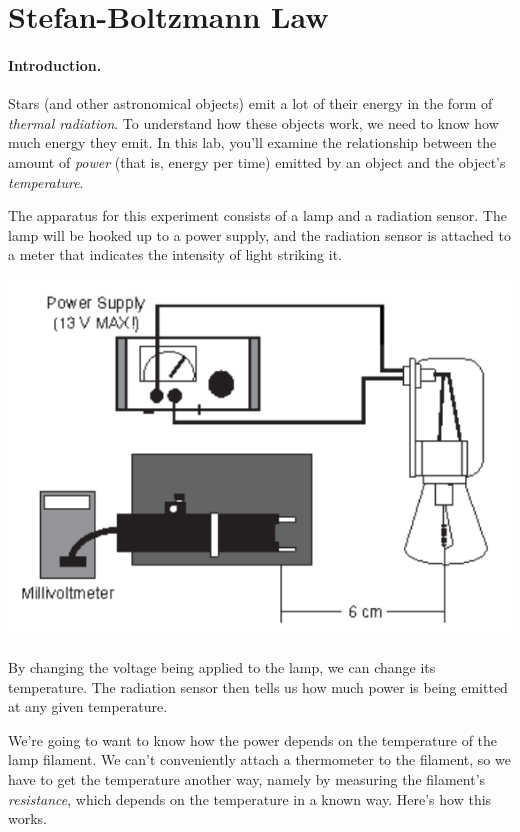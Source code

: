 \section{Stefan-Boltzmann Law}

\makelabheader


\paragraph{Introduction.}
Stars (and other astronomical objects) emit a lot of their energy
in the form of \textit{thermal radiation}. To understand how these objects
work, we need to know how much energy they emit. In this lab, you'll
examine the relationship between the amount of \textit{power} (that is,
energy per time) emitted
by an object and the object's \textit{temperature}.

The apparatus for this experiment consists of a lamp and a radiation sensor.
The lamp will be hooked up to a power supply, and the radiation sensor
is attached to a meter that indicates the intensity of light
striking it.

\centerline{\includegraphics{stefan/stefan1.pdf}}

By changing the voltage being applied to the lamp, we can change its
temperature. The radiation sensor then tells us how much power is being
emitted at any given temperature.

We're going to want to know how the power depends on the temperature of the
lamp filament. We can't conveniently attach a thermometer to the filament,
so we have to get the temperature another way, namely by measuring
the filament's \textit{resistance}, which depends on the temperature
in a known way. Here's how this works.

